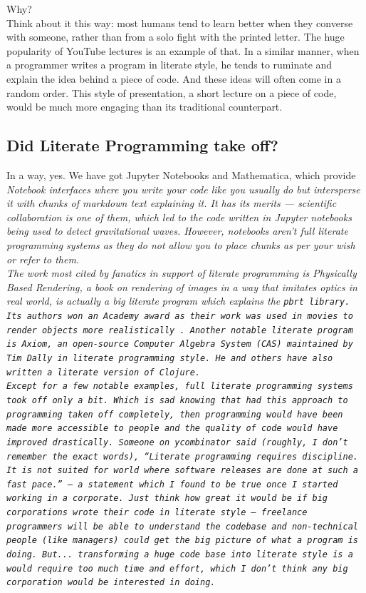 \noindent Why?\\

Think about it this way: most humans tend to learn better when they converse with someone, rather than from a
solo fight with the printed letter. The huge popularity of YouTube lectures is an example of that. In a
similar manner, when a programmer writes a program in literate style, he tends to ruminate and explain the
idea behind a piece of code. And these ideas will often come in a random order. This style of presentation, a
short lecture on a piece of code, would be much more engaging than its traditional counterpart.

\subsection{Did Literate Programming take off?}

In a way, yes. We have got Jupyter Notebooks and Mathematica, which provide \it Notebook \rm interfaces where
you write your code like you usually do but intersperse it with chunks of markdown text explaining it. It has
its merits --- scientific collaboration is one of them, which led to the code written in Jupyter notebooks
being used to detect gravitational waves. However, notebooks aren't full literate programming systems as they
do not allow you to place chunks as per your wish or refer to them.\\

The work most cited by fanatics in support of literate programming is \it Physically Based Rendering\rm, a
book on rendering of images in a way that imitates optics in real world, is actually a big literate program
which explains the \tt pbrt \rm library. Its authors won an Academy award as their work was used in movies to
render objects more realistically \cite{pharr2023physically}. Another notable literate program is \it
Axiom\rm, an open-source Computer Algebra System (CAS) maintained by Tim Dally in literate programming style.
He and others have also written a literate version of \it Clojure\rm.\\

Except for a few notable examples, full literate programming systems took off only a bit. Which is sad knowing that had this approach to
programming taken off completely, then programming would have been made more accessible to people and the
quality of code would have improved drastically. Someone on ycombinator said (roughly, I don't remember the
exact words), ``Literate programming requires discipline. It is not suited for world where software
releases are done at such a fast pace.'' --- a statement which I found to be true once I started working in a
corporate. Just think how great it would be if big corporations wrote their code in literate style ---
freelance programmers will be able to understand the codebase and non-technical people (like managers) could
get the big picture of what a program is doing. But... transforming a huge code base into literate style is a
would require too much time and effort, which I don't think any big corporation would be interested in doing.

